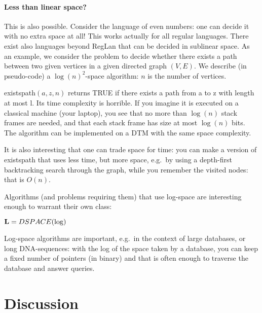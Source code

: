 \paragraph{Less than linear space?} This is also possible. Consider the
language of even numbers: one can decide it with no extra space at all!
This works actually for all regular languages. There exist also
languages beyond RegLan that can be decided in sublinear space. As an
example, we consider the problem to decide whether there exists a path
between two given vertices in a given directed graph $(V,E)$. We
describe (in pseudo-code) a $\log(n)^2$-space algorithm: $n$ is the
number of vertices.

\begin{algorithmic}
\EndIf
{}
\EndIf


   \EndIf
\EndFor
{}
\EndFunction
\end{algorithmic}

{\sc existspath}$(a,z,n)$ returns TRUE if there exists a path from a
to z with length at most l. Its time complexity is horrible. If you
imagine it is executed on a classical machine (your laptop), you see
that no more than $\log(n)$ stack frames are needed, and that each
stack frame has size at most $\log(n)$ bits. The algorithm can be
implemented on a DTM with the same space complexity.

It is also interesting that one can trade space for time: you can make
a version of \mbox{{\sc existspath}} that uses less time, but more
space, e.g.\ by using a depth-first backtracking search through the
graph, while you remember the visited nodes: that is $O(n)$.

Algorithms (and problems requiring them) that use log-space are
interesting enough to warrant their own class:

\begin{definition}
${\bf L} = DSPACE(\log)$
\end{definition}


Log-space algorithms are important, e.g.\ in the context of large
databases, or long DNA-sequences: with the log of the space taken by a
database, you can keep a fixed number of pointers (in binary) and
that is often enough to traverse the database and answer queries.

\section{Discussion}
